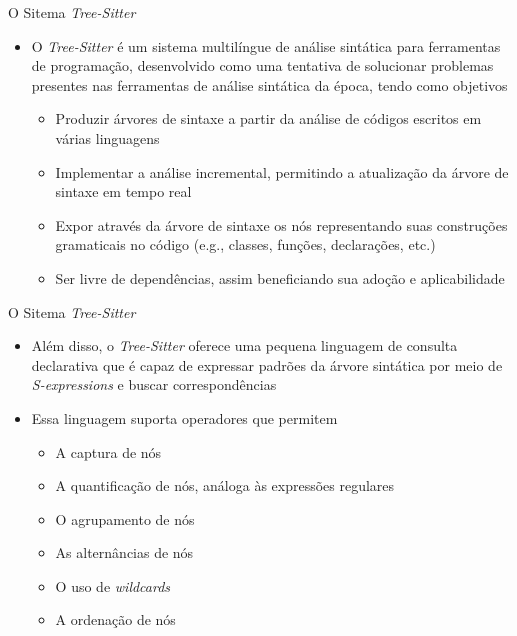 \documentclass
  [ aspectratio=169,
    english,
    hyperref={citecolor=blue,colorlinks=true,linkcolor=blue,urlcolor=blue},
    brazil]
  {beamer}
\newcommand{\treesitter}{\textit{Tree-Sitter}\xspace}
\begin{document}
  \begin{frame}{O Sitema \treesitter}
    \begin{itemize}
      \item O \treesitter \cite{tree-sitter-2023-tree} é um sistema multilíngue
            de análise sintática para ferramentas de programação, desenvolvido
            como uma tentativa de solucionar problemas presentes nas
            ferramentas de análise sintática da época, tendo como objetivos
            \begin{itemize}
              \item Produzir árvores de sintaxe a partir da análise de códigos
                    escritos em várias linguagens
              \item Implementar a análise incremental, permitindo a atualização
                    da árvore de sintaxe em tempo real
              \item Expor através da árvore de sintaxe os nós representando
                    suas construções gramaticais no código (e.g., classes,
                    funções, declarações, etc.)
              \item Ser livre de dependências, assim beneficiando sua adoção e
                    aplicabilidade
            \end{itemize}
    \end{itemize}
  \end{frame}

  \begin{frame}{O Sitema \treesitter}
    \begin{itemize}
      \item Além disso, o \treesitter oferece uma pequena linguagem de
            consulta declarativa que é capaz de expressar padrões da árvore
            sintática por meio de \textit{S-expressions} e buscar
            correspondências
      \item Essa linguagem suporta operadores que permitem
            \begin{itemize}
              \item A captura de nós
              \item A quantificação de nós, análoga às expressões regulares
              \item O agrupamento de nós
              \item As alternâncias de nós
              \item O uso de \textit{wildcards}
              \item A ordenação de nós
            \end{itemize}
    \end{itemize}
  \end{frame}
\end{document}
